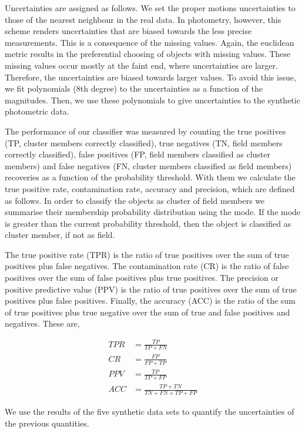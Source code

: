 Uncertainties are assigned as follows. We set the proper motions uncertainties to those of the nearest neighbour in the real data. In photometry, however, this scheme renders uncertainties that are biased towards the less precise measurements. This is a consequence of the missing values. Again, the euclidean metric results in the preferential choosing of objects with missing values. These missing values occur mostly at the faint end, where uncertainties are larger. Therefore, the uncertainties are biased towards larger values. To avoid this issue, we fit polynomials (8th degree) to the uncertainties as a function of the magnitudes. Then, we use these polynomials to give uncertainties to the synthetic photometric data.

The performance of our classifier was measured by counting the true positives (TP, cluster members correctly classified), true negatives (TN, field members correctly classified), false positives (FP, field members classified as cluster members) and false negatives (FN, cluster members classified as field members) recoveries as a function of the probability threshold. With them we calculate the true positive rate, contamination rate, accuracy and precision, which are defined as follows. In order to classify the objects as cluster of field members we summarise their membership probability distribution using the mode. If the mode is greater than the current probability threshold, then the object is classified as cluster member, if not as field.

The true positive rate (TPR) is the ratio of true positives over the sum of true positives plus false negatives. The contamination rate (CR) is the ratio of false positives over the sum of false positives plus true positives. The precision or positive predictive value (PPV) is the ratio of true positives over the sum of true positives plus false positives. Finally, the accuracy (ACC) is the ratio of the sum of true positives plus true negative over the sum of true and false positives and negatives. These are,

\begin{align}
TPR &= \frac{TP}{TP+FN} \nonumber \\
CR   &= \frac{FP}{FP+TP} \nonumber \\
PPV &= \frac{TP}{TP+FP} \nonumber \\
ACC &= \frac{TP+TN}{TN+FN+TP+FP} \nonumber
\end{align}

We use the results of the five synthetic data sets to quantify the uncertainties of the previous quantities. 

